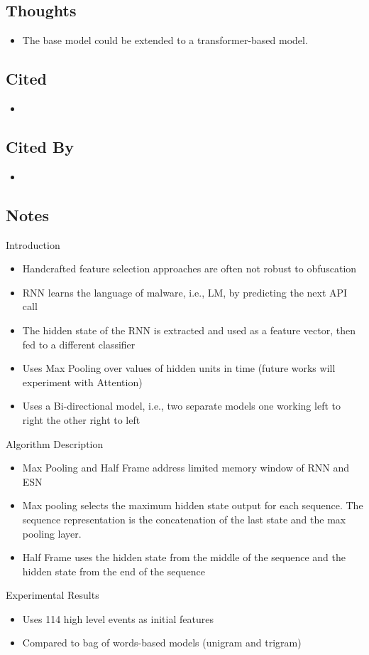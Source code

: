 \documentclass{article}
\begin{document}
\subsection*{Thoughts}
\begin{itemize}
\item The base model could be extended to a transformer-based model.
\end{itemize}

\subsection*{Cited}
\begin{itemize}
\item 
\end{itemize}

\subsection*{Cited By}
\begin{itemize}
\item
\end{itemize}

\subsection*{Notes}

Introduction
\begin{itemize}
\item Handcrafted feature selection approaches are often not robust to obfuscation
\item RNN learns the language of malware, i.e., LM, by predicting the next API call
\item The hidden state of the RNN is extracted and used as a feature vector, then fed to a different classifier
\item Uses Max Pooling over values of hidden units in time (future works will experiment with Attention)
\item Uses a Bi-directional model, i.e., two separate models one working left to right the other right to left
\end{itemize}
Algorithm Description
\begin{itemize}
\item Max Pooling and Half Frame address limited memory window of RNN and ESN
\item Max pooling selects the maximum hidden state output for each sequence. The sequence representation is the concatenation of the last state and the max pooling layer.
\item Half Frame uses the hidden state from the middle of the sequence and the hidden state from the end of the sequence
\end{itemize}
Experimental Results
\begin{itemize}
\item Uses 114 high level events as initial features
\item Compared to bag of words-based models (unigram and trigram)
\end{itemize}
\end{document}

